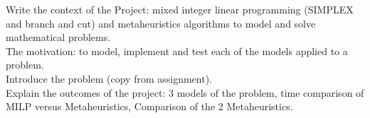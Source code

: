 
Write the context of the Project:  mixed integer linear programming (SIMPLEX and branch and cut) and metaheuristics algorithms to model and solve mathematical problems.\\

The motivation: to model, implement and test each of the models applied to a problem.\\

Introduce the problem (copy from assignment).\\

Explain the outcomes of the project: 3 models of the problem, time comparison of MILP versus Metaheuristics, Comparison of the 2 Metaheuristics.\\

 


\pagebreak